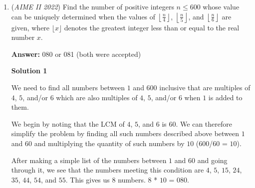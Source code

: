 \begin{enumerate}
 


 Obviously, $O_1O_2 = 30$ and $O_1X=6,O_2X=24$

 Observe that since, by definition, $\overline{PY'},\overline{PY}$ are tangents, $\overline{PY'}$ is the reflection of $\overline{PY}$ over $\overline{PO_1}$. So, $Z'$ is the reflection of $Z$ over $\overline{P0_1}$ since that is perpendicular to the line $O_1O_2$ by tangency.

 Therefore, $[PZZ']=2[PZW]$

 let $PO_2=x$

 since $\overline{PX}$ is tangent to $O_1$ at X, and $\overline{PXY}$ is tangent to $O_2$ at $Y$, and $\overline{ZW}$ is tangent to $O_1$, $\angle{PXO_1}=\angle{PYO_2}=\angle{ZWO_1}=90$°$\angle{XPO_1}$ is shared so $\triangle{PXO_1}\sim\triangle{PZW}\sim\triangle{PYO_2}$

 and thus:
 \[\frac{PO_2}{O_2X}=\frac{PO_1}{O_1Y}\implies\frac{x}{6}=\frac{x+30}{24} \implies x =10\implies PX=8\]so $\triangle{PXO_1},\triangle{PZW},\triangle{PYO_2}$ are all 3-4-5 triangles.

 


	\item (\textit{AIME II 2022}) Find the number of positive integers $n \le 600$ whose value can be uniquely determined when the values of $\left\lfloor \frac n4\right\rfloor$, $\left\lfloor\frac n5\right\rfloor$, and $\left\lfloor\frac n6\right\rfloor$ are given, where $\lfloor x \rfloor$ denotes the greatest integer less than or equal to the real number $x$.


 
 \textbf{Answer: }080 or 081 (both were accepted)



\textbf{Solution 1}

We need to find all numbers between $1$ and $600$ inclusive that are multiples of $4$, $5$, and/or $6$ which are also multiples of $4$, $5$, and/or $6$ when $1$ is added to them.

 We begin by noting that the LCM of $4$, $5$, and $6$ is $60$.  We can therefore simplify the problem by finding all such numbers described above between $1$ and $60$ and multiplying the quantity of such numbers by $10$ ($600$/$60$ = $10$).

 After making a simple list of the numbers between $1$ and $60$ and going through it, we see that the numbers meeting this condition are $4$, $5$, $15$, $24$, $35$, $44$, $54$, and $55$.  This gives us $8$ numbers.  $8$ * $10$ = $\boxed{080}$.


\end{enumerate}
